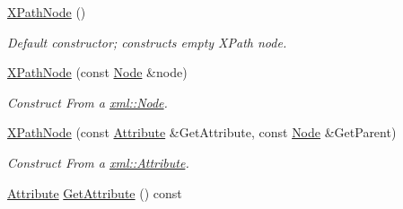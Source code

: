 \begin{DoxyCompactItemize}
\item 
\hypertarget{classMezzanine_1_1xml_1_1XPathNode_a7c6037666eb8beaaeb21414956d20709}{
\hyperlink{classMezzanine_1_1xml_1_1XPathNode_a7c6037666eb8beaaeb21414956d20709}{XPathNode} ()}
\label{classMezzanine_1_1xml_1_1XPathNode_a7c6037666eb8beaaeb21414956d20709}

\begin{DoxyCompactList}\small\item\em Default constructor; constructs empty XPath node. \item\end{DoxyCompactList}\item 
\hyperlink{classMezzanine_1_1xml_1_1XPathNode_a204e98f8857e36678e2968a0a93ef7e9}{XPathNode} (const \hyperlink{classMezzanine_1_1xml_1_1Node}{Node} \&node)
\begin{DoxyCompactList}\small\item\em Construct From a \hyperlink{classMezzanine_1_1xml_1_1Node}{xml::Node}. \item\end{DoxyCompactList}\item 
\hyperlink{classMezzanine_1_1xml_1_1XPathNode_ae73694af07ead76db472d118223e5a8d}{XPathNode} (const \hyperlink{classMezzanine_1_1xml_1_1Attribute}{Attribute} \&GetAttribute, const \hyperlink{classMezzanine_1_1xml_1_1Node}{Node} \&GetParent)
\begin{DoxyCompactList}\small\item\em Construct From a \hyperlink{classMezzanine_1_1xml_1_1Attribute}{xml::Attribute}. \item\end{DoxyCompactList}\item 
\hypertarget{classMezzanine_1_1xml_1_1XPathNode_a50be9e2ee7547d9d2d4e8965560006ea}{
\hyperlink{classMezzanine_1_1xml_1_1Attribute}{Attribute} \hyperlink{classMezzanine_1_1xml_1_1XPathNode_a50be9e2ee7547d9d2d4e8965560006ea}{GetAttribute} () const }
\label{classMezzanine_1_1xml_1_1XPathNode_a50be9e2ee7547d9d2d4e8965560006ea}


\end{DoxyCompactItemize}
